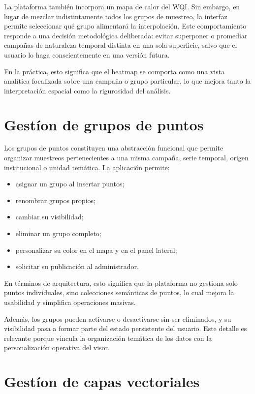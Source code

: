 \documentclass[12pt,a4paper]{report}
\begin{document}
La plataforma tambi\'en incorpora un mapa de calor del WQI. Sin embargo, en lugar de mezclar indistintamente todos los grupos de muestreo, la interfaz permite seleccionar qu\'e grupo alimentar\'a la interpolaci\'on. Este comportamiento responde a una decisi\'on metodol\'ogica deliberada: evitar superponer o promediar campa\~nas de naturaleza temporal distinta en una sola superficie, salvo que el usuario lo haga conscientemente en una versi\'on futura.

En la pr\'actica, esto significa que el heatmap se comporta como una vista anal\'itica focalizada sobre una campa\~na o grupo particular, lo que mejora tanto la interpretaci\'on espacial como la rigurosidad del an\'alisis.

\section{Gest\'ion de grupos de puntos}

Los grupos de puntos constituyen una abstracci\'on funcional que permite organizar muestreos pertenecientes a una misma campa\~na, serie temporal, origen institucional o unidad tem\'atica. La aplicaci\'on permite:

\begin{itemize}
    \item asignar un grupo al insertar puntos;
    \item renombrar grupos propios;
    \item cambiar su visibilidad;
    \item eliminar un grupo completo;
    \item personalizar su color en el mapa y en el panel lateral;
    \item solicitar su publicaci\'on al administrador.
\end{itemize}

En t\'erminos de arquitectura, esto significa que la plataforma no gestiona solo puntos individuales, sino colecciones sem\'anticas de puntos, lo cual mejora la usabilidad y simplifica operaciones masivas.

Adem\'as, los grupos pueden activarse o desactivarse sin ser eliminados, y su visibilidad pasa a formar parte del estado persistente del usuario. Este detalle es relevante porque vincula la organizaci\'on tem\'atica de los datos con la personalizaci\'on operativa del visor.

\section{Gest\'ion de capas vectoriales}
\end{document}
